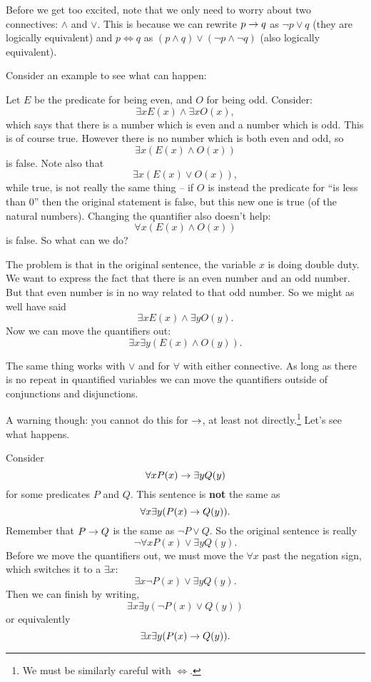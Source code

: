 \documentclass[12pt]{article}
\begin{document}
Before we get too excited, note that we only need to worry about two connectives: $\wedge$ and $\vee$.  This is because we can rewrite $p \rightarrow q$ as $\neg p \vee q$ (they are logically equivalent) and $p \iff q$ as $(p \wedge q) \vee (\neg p \wedge \neg q)$ (also logically equivalent).

Consider an example to see what can happen:

\begin{example}
  Let $E$ be the predicate for being even, and $O$ for being odd.  Consider:
\[\exists x E(x) \wedge \exists x O(x),\]
which says that there is a number which is even and a number which is odd.  This is of course true.  However there is no number which is both even and odd, so
\[\exists x (E(x) \wedge O(x))\]
is false.  Note also that
\[\exists x (E(x) \vee O(x)),\]
while true, is not really the same thing -- if $O$ is instead the predicate for ``is less than 0'' then the original statement is false, but this new one is true (of the natural numbers).  Changing the quantifier also doesn't help:
\[\forall x (E(x) \wedge O(x))\]
is false.  So what can we do?

The problem is that in the original sentence, the variable $x$ is doing double duty.  We want to express the fact that there is an even number and an odd number.  But that even number is in no way related to that odd number.  So we might as well have said
\[ \exists x E(x) \wedge \exists y O(y).\]
Now we can move the quantifiers out:
\[\exists x \exists y (E(x) \wedge O(y)).\]
\end{example}

The same thing works with $\vee$ and for $\forall$ with either connective.  As long as there is no repeat in quantified variables we can move the quantifiers outside of conjunctions and disjunctions.

A warning though: you cannot do this for $\rightarrow$, at least not directly.\footnote{We must be similarly careful with $\iff$.}  Let's see what happens.

\begin{example}
Consider
\[ \forall x P(x) \rightarrow \exists y Q(y)\]
for some predicates $P$ and $Q$.  This sentence is \textbf{not} the same as
\[ \forall x \exists y (P(x) \rightarrow Q(y)).\]
Remember that $P \rightarrow Q$ is the same as $\neg P \vee Q$.  So the original sentence is really
\[\neg \forall x P(x) \vee \exists y Q(y).\]
Before we move the quantifiers out, we must move the $\forall x$ past the negation sign, which switches it to a $\exists x$:
\[\exists x \neg P(x) \vee \exists y Q(y).\]
Then we can finish by writing,
\[\exists x \exists y (\neg P(x) \vee Q(y))\]
or equivalently
\[\exists x \exists y (P(x) \rightarrow Q(y)).\]
\end{example}
\end{document}
